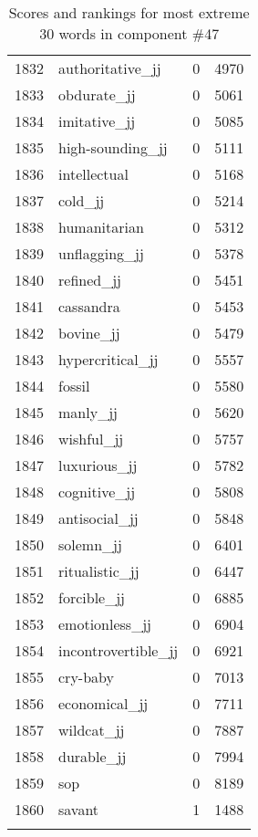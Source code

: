 \begin{longtable}[!htbp]{| rlr@{.}l |}
    1832 & authoritative\_jj & 0 & 4970 \\
    1833 & obdurate\_jj & 0 & 5061 \\
    1834 & imitative\_jj & 0 & 5085 \\
    1835 & high-sounding\_jj & 0 & 5111 \\
    1836 & intellectual & 0 & 5168 \\
    1837 & cold\_jj & 0 & 5214 \\
    1838 & humanitarian & 0 & 5312 \\
    1839 & unflagging\_jj & 0 & 5378 \\
    1840 & refined\_jj & 0 & 5451 \\
    1841 & cassandra & 0 & 5453 \\
    1842 & bovine\_jj & 0 & 5479 \\
    1843 & hypercritical\_jj & 0 & 5557 \\
    1844 & fossil & 0 & 5580 \\
    1845 & manly\_jj & 0 & 5620 \\
    1846 & wishful\_jj & 0 & 5757 \\
    1847 & luxurious\_jj & 0 & 5782 \\
    1848 & cognitive\_jj & 0 & 5808 \\
    1849 & antisocial\_jj & 0 & 5848 \\
    1850 & solemn\_jj & 0 & 6401 \\
    1851 & ritualistic\_jj & 0 & 6447 \\
    1852 & forcible\_jj & 0 & 6885 \\
    1853 & emotionless\_jj & 0 & 6904 \\
    1854 & incontrovertible\_jj & 0 & 6921 \\
    1855 & cry-baby & 0 & 7013 \\
    1856 & economical\_jj & 0 & 7711 \\
    1857 & wildcat\_jj & 0 & 7887 \\
    1858 & durable\_jj & 0 & 7994 \\
    1859 & sop & 0 & 8189 \\
    1860 & savant & 1 & 1488 \\
    \hline
    \caption{Scores and rankings for most extreme 30 words in component \#47} \\
\end{longtable}
